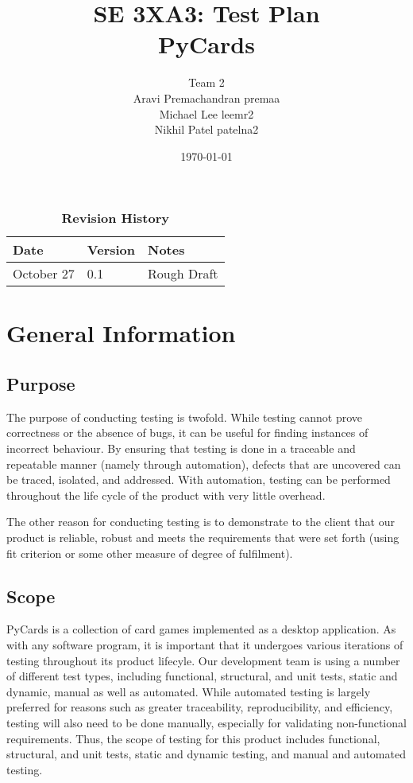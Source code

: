 \documentclass[12pt, titlepage]{article}
\title{SE 3XA3: Test Plan\\PyCards}
\author{Team 2
	\\ Aravi Premachandran  premaa
	\\ Michael Lee  leemr2
	\\ Nikhil Patel  patelna2
}
\date{\today}
\begin{document}
	\maketitle
	\tableofcontents
	\listoftables
	\listoffigures
	\begin{table}[bp]
		\caption{\bf Revision History}
		\begin{tabularx}{\textwidth}{p{3cm}p{2cm}X}
			\toprule {\bf Date} & {\bf Version} & {\bf Notes}\\
			\midrule
			October 27 & 0.1 & Rough Draft\\
			\bottomrule
		\end{tabularx}
	\end{table}
	\newpage
	\section{General Information}
	\subsection{Purpose}
	\indent \indent The purpose of conducting testing is twofold. While testing 
	cannot prove correctness or the absence of bugs, it can be useful for 
	finding instances of incorrect behaviour. By ensuring that testing is done 
	in a traceable and repeatable manner (namely through automation), defects 
	that are uncovered can be traced, isolated, and addressed. With automation, 
	testing can be performed throughout the life cycle of the product with very 
	little overhead.\par
	The other reason for conducting testing is to demonstrate to the 
	client	that our product is reliable, robust and meets the requirements 
	that were set forth (using fit criterion or some other measure of degree
	of fulfilment).
	\subsection{Scope}
	\indent\indent PyCards is a collection of card games implemented as a 
	desktop application. As with any software program, it is important that it 
	undergoes various iterations of testing throughout its product lifecyle.
	Our development team is using a number of different test types, including 
	functional, structural, and unit tests, static and dynamic, manual as well 
	as automated.
	While automated testing is largely preferred for reasons such as greater 
	traceability, reproducibility, and efficiency, testing will also need to be 
	done manually, especially for validating non-functional requirements.
	Thus, the scope of testing for this product includes functional, 
	structural, and unit tests, static and dynamic testing, and manual and 
	automated testing.
	
\end{document}

